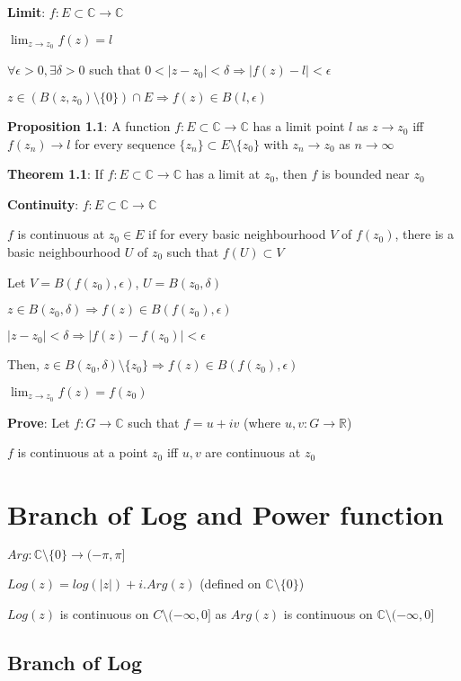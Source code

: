 \documentclass{article}
\begin{document}
\begin{flushleft}
\textbf{Limit}: $f: E\subset\mathds{C} \rightarrow \mathds{C}$

$\lim_{z \to z_0} f(z)=l$ 

$\forall \epsilon>0,\exists \delta>0$ such that $0<|z-z_0|<\delta \Rightarrow |f(z)-l|<\epsilon$ 

$z \in (B(z,z_0)\setminus\{0\})\cap E \Rightarrow f(z)\in B(l,\epsilon)$ 

\textbf{Proposition 1.1}: A function $f:E\subset  \mathds{C}\rightarrow \mathds{C}$ has a limit point $l$ as $z\rightarrow z_0$ iff $f(z_n)\rightarrow l$ for every sequence $\{z_n\}\subset E\setminus \{z_0\}$ with $z_n\rightarrow z_0$ as $n\rightarrow \infty$

\textbf{Theorem 1.1}: If $f:E\subset \mathds{C} \rightarrow \mathds{C}$ has a limit at $z_0$, then $f$ is bounded near $z_0$

\textbf{Continuity}: $f:E\subset \mathds{C}\rightarrow \mathds{C}$

$f$ is continuous at $z_0\in E$ if for every basic neighbourhood $V$ of $f(z_0)$, there is a basic neighbourhood $U$ of $z_0$ such that $f(U)\subset V$

Let $V=B(f(z_0),\epsilon)$, $U=B(z_0,\delta)$

$z\in B(z_0,\delta)\Rightarrow f(z)\in B(f(z_0),\epsilon)$

$|z-z_0|<\delta \Rightarrow |f(z)-f(z_0)|<\epsilon$

Then, $z\in B(z_0,\delta)\setminus \{z_0\} \Rightarrow f(z)\in B(f(z_0),\epsilon)$

$\lim_{z \to z_0} f(z)=f(z_0)$

\textbf{Prove}: Let $f:G\rightarrow \mathds{C}$ such that $f=u+ iv$ (where $u,v:G\rightarrow \mathds{R}$)

$f$ is continuous at a point $z_0$ iff $u,v$ are continuous at $z_0$

\clearpage

\section{Branch of Log and Power function}

$Arg: \mathds{C}\setminus \{0\} \rightarrow (-\pi,\pi]$

$Log(z)=log(|z|)+i.Arg(z)$ (defined on $\mathds{C}\setminus \{0\}$)

$Log(z)$ is continuous on $C\setminus (-\infty,0]$ as $Arg(z)$ is continuous on $\mathds{C}\setminus (-\infty,0]$

\subsection{\textbf{Branch of Log}}


\end{flushleft}
\end{document}
